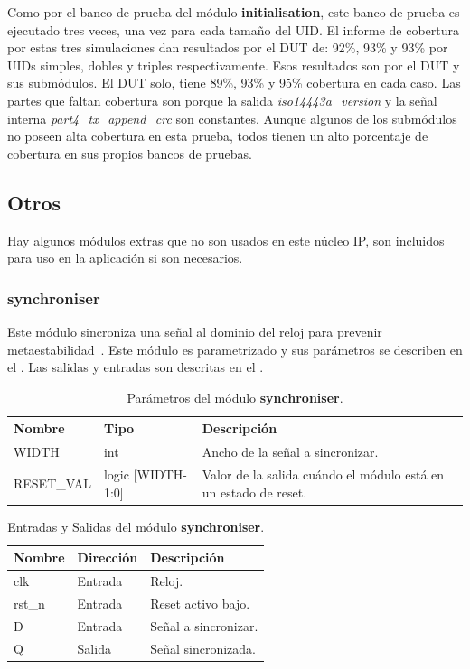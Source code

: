 \documentclass[a4paper, twoside, 11pt]{report}
\begin{document}
Como por el banco de prueba del módulo \textbf{initialisation}, este banco de prueba es ejecutado tres veces, una vez para cada tamaño del UID. El informe de cobertura por estas tres simulaciones dan resultados por el DUT de: 92\%, 93\% y 93\% por UIDs simples, dobles y triples respectivamente. Esos resultados son por el DUT y sus submódulos. El DUT solo, tiene 89\%, 93\% y 95\% cobertura en cada caso. Las partes que faltan cobertura son porque la salida \textit{iso14443a\_version} y la señal interna \textit{part4\_tx\_append\_crc} son constantes. Aunque algunos de los submódulos no poseen alta cobertura en esta prueba, todos tienen un alto porcentaje de cobertura en sus propios bancos de pruebas.

\FloatBarrier
\subsection{Otros}

Hay algunos módulos extras que no son usados en este núcleo IP, son incluidos para uso en la aplicación si son necesarios.

\FloatBarrier
\subsubsection{synchroniser}

Este módulo sincroniza una señal al dominio del reloj para prevenir metaestabilidad~\cite{synch_arb_in_digital_systems}. Este módulo es parametrizado y sus parámetros se describen en el . Las salidas y entradas son descritas en el .

\begin{table}[htb]
  \centering
  \tablezebra
  \begin{tabulary}{\linewidth}{l|l|L}
    \textbf{Nombre}&\textbf{Tipo}&\textbf{Descripción} \\
    \hline
    WIDTH&int&Ancho de la señal a sincronizar. \\
    RESET\_VAL&logic [WIDTH-1:0]&Valor de la salida cuándo el módulo está en un estado de reset. \\
  \end{tabulary}
  \caption{Parámetros del módulo \textbf{synchroniser}.}
  \label{tab:params_synchroniser}
\end{table}

\begin{table}[htb]
  \centering
  \tablezebra
  \begin{tabulary}{\linewidth}{l|l|L}
    \textbf{Nombre}&\textbf{Dirección}&\textbf{Descripción} \\
    \hline
    clk&Entrada&Reloj. \\
    rst\_n&Entrada&Reset activo bajo. \\
    D&Entrada&Señal a sincronizar. \\
    Q&Salida&Señal sincronizada. \\
  \end{tabulary}
  \caption{Entradas y Salidas del módulo \textbf{synchroniser}.}
  \label{tab:ports_synchroniser}
\end{table}
\end{document}
